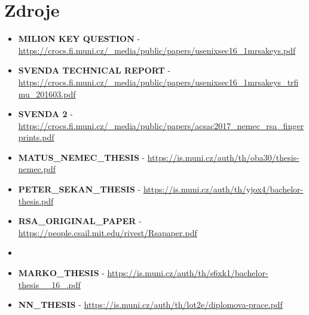 \chapter{Zdroje}

\begin{itemize}

\item \textbf{MILION KEY QUESTION} - 
\url{https://crocs.fi.muni.cz/_media/public/papers/usenixsec16_1mrsakeys.pdf}
\item \textbf{SVENDA TECHNICAL REPORT} - 
\url{https://crocs.fi.muni.cz/_media/public/papers/usenixsec16_1mrsakeys_trfimu_201603.pdf}
\item \textbf{SVENDA 2} - 
\url{https://crocs.fi.muni.cz/_media/public/papers/acsac2017_nemec_rsa_fingerprints.pdf}
\item \textbf{MATUS\_NEMEC\_THESIS} -
\url{https://is.muni.cz/auth/th/oba30/thesis-nemec.pdf}
\item \textbf{PETER\_SEKAN\_THESIS} -
\url{https://is.muni.cz/auth/th/yjox4/bachelor-thesis.pdf}
\item \textbf{RSA\_ORIGINAL\_PAPER} - 
\url{https://people.csail.mit.edu/rivest/Rsapaper.pdf}

\item

\item \textbf{MARKO\_THESIS} - 
\url{https://is.muni.cz/auth/th/s6xk1/bachelor-thesis__16_.pdf}
\item \textbf{NN\_THESIS} - 
\url{https://is.muni.cz/auth/th/lot2e/diplomova-prace.pdf}

\end{itemize}